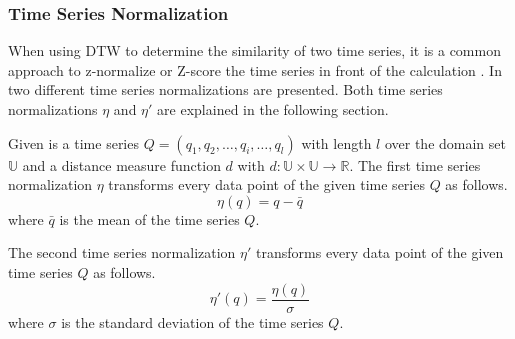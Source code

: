 \subsubsection{Time Series Normalization} \label{time_series_normalization}
When using DTW to determine the similarity of two time series, it is a common approach to z-normalize or Z-score the
time series in front of the calculation \cite{ding2008querying}. In \cite{das1998rule} two different time series
normalizations are presented. Both time series normalizations $\eta$ and $\eta '$ are explained in the following
section.

Given is a time series $Q = (q_1, q_2, \dots, q_i, \dots, q_l)$ with length $l$ over the domain set $\mathbb{U}$ and a
distance measure function $d$ with $d: \mathbb{U} \times \mathbb{U} \to \mathbb{R}$. The first time series normalization
$\eta$ transforms every data
point of the given time series $Q$ as follows.
\begin{equation}
    \eta (q) = q -\bar{q}
\end{equation}
where $\bar{q}$ is the mean of the time series $Q$.

The second time series normalization $\eta '$ transforms every data point of the given time series $Q$ as follows.
\begin{equation}
    \eta '(q) = \frac{\eta (q)}{\sigma}
\end{equation}
where $\sigma$ is the standard deviation of the time series $Q$.
